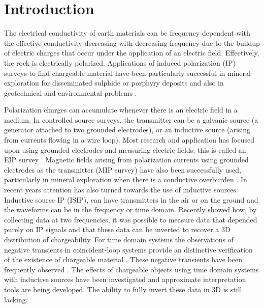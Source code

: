 \documentclass[extra,mreferee]{gji}
\begin{document}

\linenumbers
\section{Introduction}
The electrical conductivity of earth materials can be frequency dependent with the effective conductivity decreasing with decreasing frequency due to the buildup of electric charges that occur under the application of an electric field. Effectively, the rock is electrically polarized. 
Applications of induced polarization (IP) surveys to find chargeable material  have been particularly successful in mineral exploration for disseminated sulphide or porphyry deposits \cite[]{Pelton1978, Fink1990} and also in geotechnical and environmental problems \cite[]{Li2000,Kemna2012}.


Polarization charges can accumulate whenever there is an electric field in a medium. In controlled source surveys, the transmitter can be a galvanic source (a generator attached to two grounded electrodes), or an inductive source (arising from currents flowing in a wire loop). Most research and application has focused upon using grounded electrodes and measuring electric fields; this is called an EIP survey \cite[]{seigel1959}. Magnetic fields arising from polarization currents using grounded electrodes as the transmitter (MIP survey) have also been successfully used, particularly in mineral exploration when there is a conductive overburden \cite[]{seigel1974}. In recent years attention has also turned towards the use of inductive sources. Inductive source IP (ISIP), can have transmitters in the air or on the ground and the waveforms can be in  the frequency or time domain. Recently  \cite[]{Marchant2012b} showed how, by collecting data at two frequencies, it was possible to measure data that depended purely on IP signals and that these data can be inverted to recover a 3D distribution of chargeability. 
For time domain systems the observations of negative transients in coincident-loop systems provide an distinctive verification of the existence of chargeable material \cite[]{Weidelt1982}. These negative transients have been frequently observed \cite[]{SmithandKlein,Kang2015a}. The effects of chargeable objects using time domain systems with inductive sources have been investigated \cite[]{Smith1988a,Flis1989,ElKaliouby2004, Marchant2014} and approximate interpretation tools \cite[]{Kratzer2012,Hodges2014} are being developed. The ability to fully invert these data in 3D is still lacking. 
\end{document}

